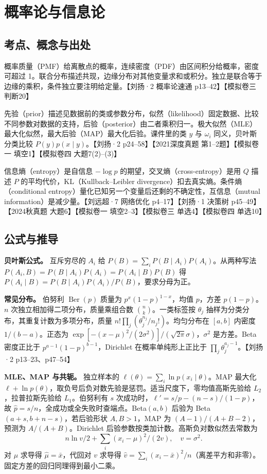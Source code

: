 \documentclass[UTF8,a4paper,zihao=-4,fontset=fandol]{ctexart}
\begin{document}
\section{概率论与信息论}
\subsection{考点、概念与出处}
概率质量（PMF）给离散点的概率，连续密度（PDF）由区间积分给概率，密度可超过 1。联合分布描述共现，边缘分布对其他变量求和或积分。独立是联合等于边缘的乘积，条件独立要注明给定量。【刘扬·2 概率论速通 p13--42】【模拟卷三 判断20】
 
先验（prior）描述见数据前的类或参数分布，似然（likelihood）固定数据、比较不同参数对数据的支持，后验（posterior）由二者乘积归一。极大似然（MLE）最大化似然，最大后验（MAP）最大化后验。课件里的类 \(y\) 与 \(\omega_i\) 同义，贝叶斯分类比较 \(P(y)p(x\mid y)\)。【刘扬·2 p24--58】【2021深度真题 第1--2题】【模拟卷一 填空1】【模拟卷四 大题7(2)--(3)】
 
信息熵（entropy）是自信息 \(-\log p\) 的期望，交叉熵（cross-entropy）是用 \(Q\) 描述 \(P\) 的平均代价，KL（Kullback--Leibler divergence）扣去真实熵。条件熵（conditional entropy）量化已知另一个变量后还剩的不确定性，互信息（mutual information）是减少量。【刘远超·7 网络优化 p4--17】【刘扬·1 决策树 p45--49】【2024秋真题 大题6】【模拟卷一 填空2--3】【模拟卷三 单选4】【模拟卷四 单选10】

\subsection{公式与推导}
\textbf{贝叶斯公式。} 互斥穷尽的 \(A_i\) 给 \(P(B)=\sum_iP(B\mid A_i)P(A_i)\)。从两种写法 \(P(A_i,B)=P(B\mid A_i)P(A_i)=P(A_i\mid B)P(B)\) 得
\(P(A_i\mid B)=P(B\mid A_i)P(A_i)/P(B)\)，要求分母为正。
 
\textbf{常见分布。} 伯努利 \(\operatorname{Ber}(p)\) 质量为 \(p^x(1-p)^{1-x}\)，均值 \(p\)，方差 \(p(1-p)\)。\(n\) 次独立相加得二项分布，质量乘组合数 \(\binom nk\)。一类标签按 \(\theta_j\) 抽样为分类分布，其重复计数为多项分布，质量 \(n!\prod_j(\theta_j^{n_j}/n_j!)\)。均匀分布在 \([a,b]\) 内密度 \(1/(b-a)\)。正态为 \(\exp[-(x-\mu)^2/(2\sigma^2)]/(\sqrt{2\pi}\sigma)\)，\(\sigma^2\) 是方差。Beta 密度正比于 \(p^{a-1}(1-p)^{b-1}\)，Dirichlet 在概率单纯形上正比于 \(\prod_j\theta_j^{a_j-1}\)。【刘扬·2 p13--23、p47--54】
 
\textbf{MLE、MAP 与共轭。} 独立样本的 \(\ell(\theta)=\sum_i\ln p(x_i\mid\theta)\)。MAP 最大化 \(\ell+\ln p(\theta)\)，取负号后负对数先验是惩罚。适当尺度下，零均值高斯先验给 \(L_2\)，拉普拉斯先验给 \(L_1\)。伯努利有 \(s\) 次成功时，\(\ell'=s/p-(n-s)/(1-p)\)，故 \(\hat p=s/n\)，全成功或全失败时查端点。Beta\((a,b)\) 后验为 Beta\((a+s,b+n-s)\)，若后验形状 \(A,B>1\)，MAP 为 \((A-1)/(A+B-2)\)，预测为 \(A/(A+B)\)。Dirichlet 后验参数按类加计数。高斯负对数似然去常数为
\[
 n\ln v/2+\sum_i(x_i-\mu)^2/(2v),\quad v=\sigma^2.
\]
对 \(\mu\) 求导得 \(\hat\mu=\bar x\)，代回对 \(v\) 求导得 \(\hat v=\sum_i(x_i-\bar x)^2/n\)（离差平方和非零）。固定方差的回归同理得到最小二乘。
 
\end{document}
